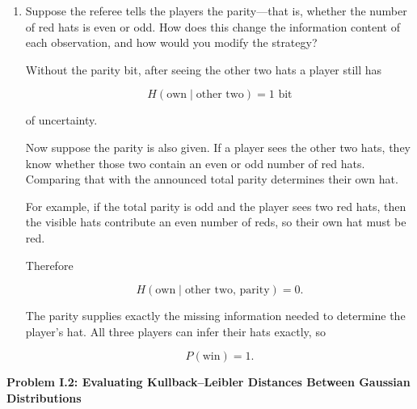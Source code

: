 \documentclass[11pt]{article}
\newcommand{\problem}[1]{%
    \vspace{1em}
    {\large\bfseries #1}
    \par
    \vspace{0.4em}
}
\begin{document}
\begin{enumerate}
\[
\hat x_1=-(x_2+x_3)\pmod4.
\]

All three guesses are correct exactly when the actual colors satisfy

\[
x_1+x_2+x_3=0\pmod4.
\]

For any choices of \(x_1,x_2\), exactly one of the four possible values of
\(x_3\) makes this true. Thus

\[
P(\text{win})=\frac14.
\]

By comparison, if all three independently guess one of four colors,

\[
P(\text{all correct})
=
\left(\frac14\right)^3
=
\frac1{64}.
\]

So coordination again helps substantially. The useful ideas are
\(q\)-ary codes, modular checksums, parity constraints, and Hamming distance.

\item Suppose the referee tells the players the parity---that is,
whether the number of red hats is even or odd. How does this change
the information content of each observation, and how would you modify
the strategy?

Without the parity bit, after seeing the other two hats a player still has

\[
H(\text{own}\mid\text{other two})=1\text{ bit}
\]

of uncertainty.

Now suppose the parity is also given. If a player sees the other two hats,
they know whether those two contain an even or odd number of red hats.
Comparing that with the announced total parity determines their own hat.

For example, if the total parity is odd and the player sees two red hats,
then the visible hats contribute an even number of reds, so their own hat
must be red.

Therefore

\[
H(\text{own}\mid\text{other two, parity})=0.
\]

The parity supplies exactly the missing information needed to determine
the player's hat. All three players can infer their hats exactly, so

\[
P(\text{win})=1.
\]

\end{enumerate}


\problem{Problem I.2: Evaluating Kullback--Leibler Distances Between Gaussian Distributions}
\end{document}
